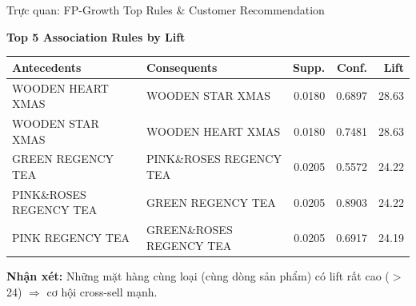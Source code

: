 \documentclass[10pt, aspectratio=169]{beamer}
\renewcommand{\arraystretch}{1.2}
\begin{document}
\begin{frame}[fragile]{Trực quan: FP-Growth Top Rules \& Customer Recommendation}
    
    \textbf{Top 5 Association Rules by Lift}
    
    \vspace{-0.15cm}
    \begin{center}
        \scriptsize
        \setlength{\tabcolsep}{2.5pt}
        \renewcommand{\arraystretch}{1.1}
        \begin{tabular}{>{\raggedright\arraybackslash}p{2.9cm}>{\raggedright\arraybackslash}p{2.9cm}rrr}
        \toprule
        \textbf{Antecedents} & \textbf{Consequents} & \textbf{Supp.} & \textbf{Conf.} & \textbf{Lift} \\
        \midrule
        WOODEN HEART XMAS & WOODEN STAR XMAS & 0.0180 & 0.6897 & 28.63 \\
        WOODEN STAR XMAS & WOODEN HEART XMAS & 0.0180 & 0.7481 & 28.63 \\
        GREEN REGENCY TEA & PINK\&ROSES REGENCY TEA & 0.0205 & 0.5572 & 24.22 \\
        PINK\&ROSES REGENCY TEA & GREEN REGENCY TEA & 0.0205 & 0.8903 & 24.22 \\
        PINK REGENCY TEA & GREEN\&ROSES REGENCY TEA & 0.0205 & 0.6917 & 24.19 \\
        \bottomrule
        \end{tabular}
    \end{center}
    
    \textbf{Nhận xét:} Những mặt hàng cùng loại (cùng dòng sản phẩm) có lift rất cao ($>$24) $\Rightarrow$ cơ hội cross-sell mạnh.
\end{frame}
\end{document}

